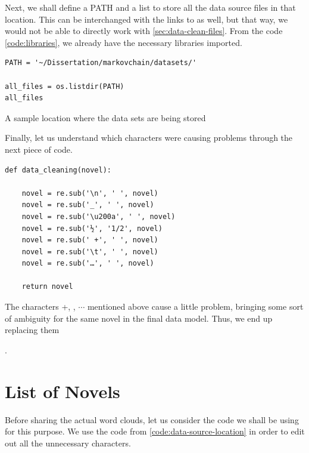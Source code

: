 Next, we shall define a PATH and a list to store all the data source files in that location. This can be interchanged with the links to \textcite{project-gutenburg} as well, but that way, we would not be able to directly work with \ref{sec:data-clean-files}. From the code \ref{code:libraries}, we already have the necessary libraries imported.

\begin{code}
\label{code:data-source-location}
\begin{verbatim}
PATH = '~/Dissertation/markovchain/datasets/'

all_files = os.listdir(PATH)
all_files

\end{verbatim}
\caption{A sample location where the data sets are being stored}
\end{code}

Finally, let us understand which characters were causing problems through the next piece of code.


\begin{code}
\label{code:data-clean}
\begin{verbatim}
def data_cleaning(novel):
    
    novel = re.sub('\n', ' ', novel)
    novel = re.sub('_', ' ', novel)
    novel = re.sub('\u200a', ' ', novel)
    novel = re.sub('½', '1/2', novel)
    novel = re.sub(' +', ' ', novel)
    novel = re.sub('\t', ' ', novel)
    novel = re.sub('…', ' ', novel)
    
    return novel

\end{verbatim}
\caption{The characters +, \textunderscore, $\cdots$ mentioned above cause a little problem, bringing some sort of ambiguity for the same novel in the final data model. Thus, we end up replacing them}.
\end{code}


\section{List of Novels} %
\label{sec:novels-list} %

Before sharing the actual word clouds, let us consider the code we shall be using for this purpose. We use the code from \ref{code:data-source-location} in order to edit out all the unnecessary characters.

